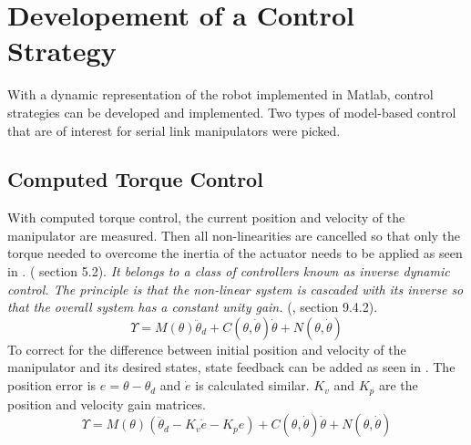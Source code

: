 \chapter{Developement of a Control Strategy}

With a dynamic representation of the robot implemented in Matlab, control strategies can be developed and implemented. 
Two types of model-based control that are of interest for serial link manipulators were picked.

\section{Computed Torque Control}
With computed torque control, the current position and velocity of the manipulator are measured. Then all non-linearities are cancelled so that only the torque needed to overcome the inertia of the actuator needs to be applied as seen in . (\cite{MathIntroRobManip} section 5.2).%
\textit{It belongs to a class of controllers known as inverse dynamic control. The principle is that the non-linear system is cascaded with its inverse so that the overall system has a constant unity gain.} (\cite{CorkeRoboticVisionControl}, section 9.4.2).%
\begin{equation}\label{eq:Torquecontr_noPD}
	\Upsilon = M(\theta)\ddot{\theta}_d + C(\theta,\dot{\theta})\dot{\theta} + N(\theta,\dot{\theta})
\end{equation}
To correct for the difference between initial position and velocity of the manipulator and its desired states, state feedback can be added as seen in . The position error is $e=\theta - \theta_d $ and $\dot{e}$ is calculated similar. $K_v$ and $K_p$ are the position and velocity gain matrices. \cite{MathIntroRobManip}
\begin{equation}\label{eq:Torquecontr}
	\Upsilon = M(\theta)(\ddot{\theta}_d -K_v \dot{e} - K_p e) + C(\theta,\dot{\theta})\dot{\theta} + N(\theta,\dot{\theta})
\end{equation}

